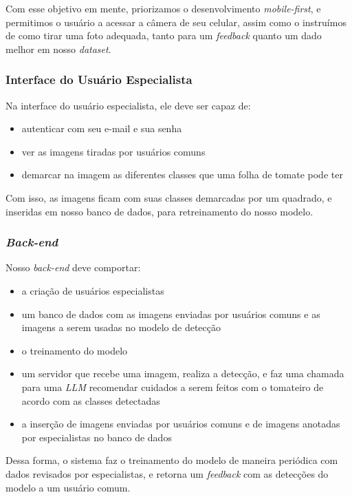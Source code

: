 Com esse objetivo em mente, priorizamos o desenvolvimento \textit{mobile-first}, e permitimos o usuário a acessar a câmera de seu celular, assim como o instruímos de como tirar uma foto adequada, tanto para um \textit{feedback} quanto um dado melhor em nosso \textit{dataset}.

\subsubsection{{Interface do Usuário Especialista} \label{sec:abst-esp}}

Na interface do usuário especialista, ele deve ser capaz de:

\begin{itemize}
    \item autenticar com seu e-mail e sua senha
    \item ver as imagens tiradas por usuários comuns
    \item demarcar na imagem as diferentes classes que uma folha de tomate pode ter
\end{itemize}

Com isso, as imagens ficam com suas classes demarcadas por um quadrado, e inseridas em nosso banco de dados, para retreinamento do nosso modelo. 

\subsubsection{{\emph{Back-end}}\label{sec:back-end-intro}}

Nosso \emph{back-end} deve comportar:

\begin{itemize}
    \item a criação de usuários especialistas
    \item um banco de dados com as imagens enviadas por usuários comuns e as imagens a serem usadas no modelo de detecção
    \item o treinamento do modelo
    \item um servidor que recebe uma imagem, realiza a detecção, e faz uma chamada para uma \emph{LLM} recomendar cuidados a serem feitos com o tomateiro de acordo com as classes detectadas
    \item a inserção de imagens enviadas por usuários comuns e de imagens anotadas por especialistas no banco de dados
\end{itemize}

Dessa forma, o sistema faz o treinamento do modelo de maneira periódica com dados revisados por especialistas, e retorna um \textit{feedback} com as detecções do modelo a um usuário comum.

